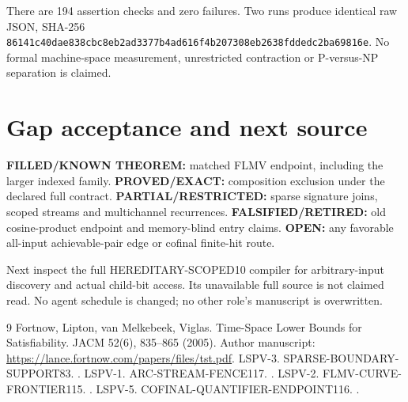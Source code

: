 \documentclass[11pt]{article}
\begin{document}
There are 194 assertion checks and zero failures. Two runs produce identical raw JSON, SHA-256 \texttt{86141c40dae838cbc8eb2ad3377b4ad616f4b207308eb2638fddedc2ba69816e}. No formal machine-space measurement, unrestricted contraction or P-versus-NP separation is claimed.

\section{Gap acceptance and next source}
\noindent\textbf{FILLED/KNOWN THEOREM:} matched FLMV endpoint, including the larger indexed family. \textbf{PROVED/EXACT:} composition exclusion under the declared full contract. \textbf{PARTIAL/RESTRICTED:} sparse signature joins, scoped streams and multichannel recurrences. \textbf{FALSIFIED/RETIRED:} old cosine-product endpoint and memory-blind entry claims. \textbf{OPEN:} any favorable all-input achievable-pair edge or cofinal finite-hit route.

Next inspect the full HEREDITARY-SCOPED10 compiler for arbitrary-input discovery and actual child-bit access. Its unavailable full source is not claimed read. No agent schedule is changed; no other role's manuscript is overwritten.

\begin{thebibliography}{9}
 Fortnow, Lipton, van Melkebeek, Viglas. Time-Space Lower Bounds for Satisfiability. JACM 52(6), 835--865 (2005). Author manuscript: \url{https://lance.fortnow.com/papers/files/tst.pdf}.
 LSPV-3. SPARSE-BOUNDARY-SUPPORT83. .
 LSPV-1. ARC-STREAM-FENCE117. .
 LSPV-2. FLMV-CURVE-FRONTIER115. .
 LSPV-5. COFINAL-QUANTIFIER-ENDPOINT116. .
\end{thebibliography}
\end{document}
